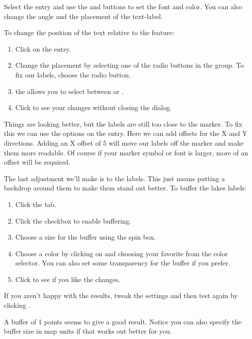 Select the  entry and use the  and 
buttons to set the font and color. You can also change the angle and the
placement of the text-label.

To change the position of the text relative to the feature:

\begin{enumerate}
\item Click on the  entry.
\item Change the placement by selecting one of the radio buttons
in the  group. To fix our labels, choose the
 radio button.
\item the  allows you to select between
 or .
\item Click  to see your changes without closing the dialog.
\end{enumerate}

Things are looking better, but the labels are still too close to the marker. To
fix this we can use the options on the  entry. Here we can add
offsets for the X and Y directions. Adding an X offset of 5 will move our
labels off the marker and make them more readable. Of course if your marker
symbol or font is larger, more of an offset will be required.

The last adjustment we'll make is to  the labels. This just means
putting a backdrop around them to make them stand out better. To buffer the
lakes labels:

\begin{enumerate}
\item Click the  tab.
\item Click the  checkbox to enable buffering.
\item Choose a size for the buffer using the spin box.
\item Choose a color by clicking on  and choosing your
  favorite from the color selector. You can also set some transparency for the
  buffer if you prefer.
\item Click  to see if you like the changes.
\end{enumerate}

If you aren't happy with the results, tweak the settings and then test again
by clicking .

A buffer of 1 points seems to give a good result.
Notice you can also specify the buffer size in map units if that works out
better for you.

